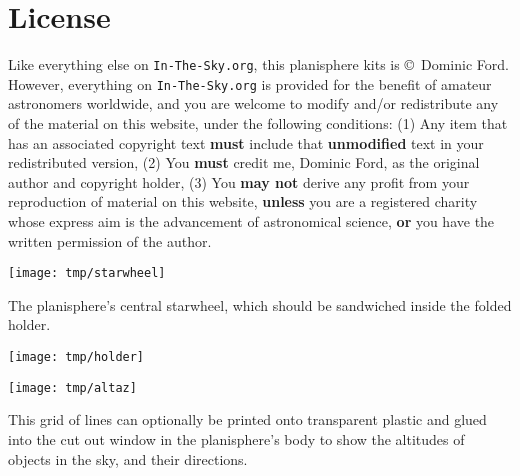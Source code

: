 \documentclass[a4paper,onecolumn,10pt]{article}
\begin{document}
\section*{License}

Like everything else on {\tt In-The-Sky.org}, this planisphere kits is
\copyright\ Dominic Ford. However, everything on {\tt In-The-Sky.org} is
provided for the benefit of amateur astronomers worldwide, and you are welcome
to modify and/or redistribute any of the material on this website, under the
following conditions: (1) Any item that has an associated copyright text {\bf
must} include that {\bf unmodified} text in your redistributed version, (2) You
{\bf must} credit me, Dominic Ford, as the original author and copyright
holder, (3) You {\bf may not} derive any profit from your reproduction of
material on this website, {\bf unless} you are a registered charity whose
express aim is the advancement of astronomical science, {\bf or} you have the
written permission of the author.

\newpage

\centerline{\texttt{[image: tmp/starwheel]}}

\vspace{1cm}
The planisphere's central starwheel, which should be sandwiched inside the folded holder.

\newpage
\thispagestyle{empty}
\vspace*{-3.0cm}
\centerline{\texttt{[image: tmp/holder]}}
\newpage

\centerline{\texttt{[image: tmp/altaz]}}

\vspace{1cm}
This grid of lines can optionally be printed onto transparent plastic and glued into the cut out window in the planisphere's body to show the altitudes of objects in the sky, and their directions.
\end{document}
